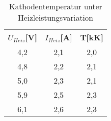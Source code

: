 \begin{table}[h]
	\begin{center}
		\begin{tabular}{ccc}
			$U_{Heiz}$[V]&$I_{Heiz}$[A]&T[kK] \\ \hline
			4{,}2&2{,}1&2{,}0\\
			4{,}8&2{,}2&2{,}1\\
			5{,}0&2{,}3&2{,}1\\
			5{,}9&2{,}5&2{,}3\\
			6{,}1&2{,}6&2{,}3
		\end{tabular}
		\caption{Kathodentemperatur unter Heizleistungsvariation}
		\label{tabd1}
	\end{center}
\end{table}
